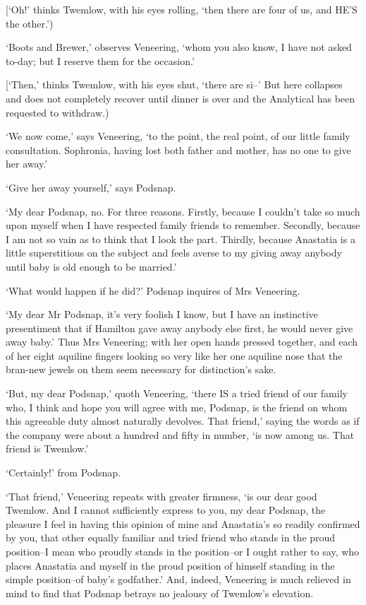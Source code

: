 [‘Oh!’ thinks Twemlow, with his eyes rolling, ‘then there are four of
us, and HE’S the other.’)

‘Boots and Brewer,’ observes Veneering, ‘whom you also know, I have not
asked to-day; but I reserve them for the occasion.’

[‘Then,’ thinks Twemlow, with his eyes shut, ‘there are si--’ But here
collapses and does not completely recover until dinner is over and the
Analytical has been requested to withdraw.)

‘We now come,’ says Veneering, ‘to the point, the real point, of our
little family consultation. Sophronia, having lost both father and
mother, has no one to give her away.’

‘Give her away yourself,’ says Podsnap.

‘My dear Podsnap, no. For three reasons. Firstly, because I couldn’t
take so much upon myself when I have respected family friends to
remember. Secondly, because I am not so vain as to think that I look
the part. Thirdly, because Anastatia is a little superstitious on the
subject and feels averse to my giving away anybody until baby is old
enough to be married.’

‘What would happen if he did?’ Podsnap inquires of Mrs Veneering.

‘My dear Mr Podsnap, it’s very foolish I know, but I have an instinctive
presentiment that if Hamilton gave away anybody else first, he would
never give away baby.’ Thus Mrs Veneering; with her open hands pressed
together, and each of her eight aquiline fingers looking so very like
her one aquiline nose that the bran-new jewels on them seem necessary
for distinction’s sake.

‘But, my dear Podsnap,’ quoth Veneering, ‘there IS a tried friend of
our family who, I think and hope you will agree with me, Podsnap, is
the friend on whom this agreeable duty almost naturally devolves. That
friend,’ saying the words as if the company were about a hundred and
fifty in number, ‘is now among us. That friend is Twemlow.’

‘Certainly!’ from Podsnap.

‘That friend,’ Veneering repeats with greater firmness, ‘is our dear
good Twemlow. And I cannot sufficiently express to you, my dear Podsnap,
the pleasure I feel in having this opinion of mine and Anastatia’s so
readily confirmed by you, that other equally familiar and tried friend
who stands in the proud position--I mean who proudly stands in the
position--or I ought rather to say, who places Anastatia and myself in
the proud position of himself standing in the simple position--of baby’s
godfather.’ And, indeed, Veneering is much relieved in mind to find that
Podsnap betrays no jealousy of Twemlow’s elevation.

